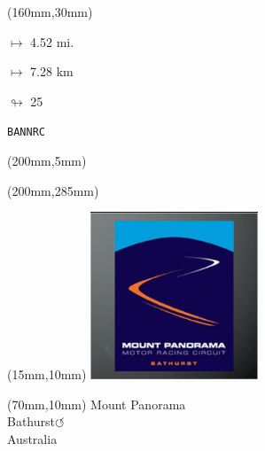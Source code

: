 \begin{textblock*}{40mm}(160mm,30mm)%
\Large
\par$\mapsto$ 4.52 mi.
\par$\mapsto$ 7.28 km
\par$\looparrowright$ 25
\par\hfill\tiny\tt BANNRC\\
\end{textblock*}
\begin{textblock*}{20mm}(200mm,5mm)%
\fbox{\thepage}
\label{BANNRC}
\end{textblock*}
\begin{textblock*}{20mm}(200mm,285mm)%
\fbox{\thepage}
\end{textblock*}

\null\newpage
\begin{textblock*}{50mm}(15mm,10mm)%
\includegraphics[width=50mm]{LG/2015-05-20_00087.png}
\end{textblock*}
\begin{textblock*}{130mm}(70mm,10mm)%
{\fontsize{20}{20}\selectfont Mount Panorama\\}
{\fontsize{16}{16}\selectfont Bathurst\hfill \Large$\circlearrowleft$\\}
{\fontsize{12}{12}\selectfont Australia\\}
\end{textblock*}
